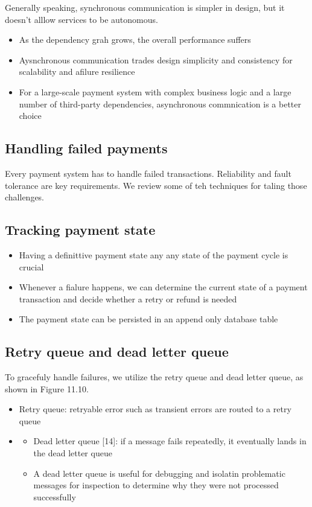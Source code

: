 \documentclass{report}
\theoremstyle{definition}
\let\oldsubsection\subsection
\renewcommand{\subsection}{\oldsubsection*}
\begin{document}
Generally speaking, synchronous communication is simpler in design, but it doesn't alllow services to be autonomous.

\begin{itemize}
\item
As the dependency grah grows, the overall performance suffers
\item
Aysnchronous communication trades design simplicity and consistency for scalability and afilure resilience
\item
For a large-scale payment system with complex business logic and a large number of third-party dependencies, asynchronous commnication is a better choice
\end{itemize}

\subsection{Handling failed payments}

Every payment system has to handle failed transactions. Reliability and fault tolerance are key requirements. We review some of teh techniques for taling those challenges.

\subsection{Tracking payment state}

\begin{itemize}
\item
Having a definittive payment state any any state of the payment cycle is crucial
\item
Whenever a fialure happens, we can determine the current state of a payment transaction and decide whether a retry or refund is needed
\item
The payment state can be persisted in an append only database table
\end{itemize}

\subsection{Retry queue and dead letter queue}

To gracefuly handle failures, we utilize the retry queue and dead letter queue, as shown in Figure 11.10.

\begin{itemize}
\item
Retry queue: retryable error such as transient errors are routed to a retry queue
\item
\begin{itemize}
\item
Dead letter queue [14]: if a message fails repeatedly, it eventually lands in the dead letter queue
\item
A dead letter queue is useful for debugging and isolatin problematic messages for inspection to determine why they were not processed successfully
\end{itemize}
\end{itemize}
\end{document}
